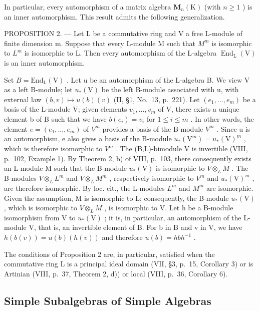 In particular, every automorphism of a matrix algebra \(\mathbf{M}_{n}(\mathrm{K})\) (with \(n \geqslant 1\) ) is an inner automorphism. This result admits the following generalization.

PROPOSITION 2. --- Let L be a commutative ring and V a free L-module of finite dimension m. Suppose that every L-module M such that \(M^{m}\) is isomorphic to \(L^{m}\) is isomorphic to L. Then every automorphism of the L-algebra \(\operatorname{End}_{\mathrm{L}}(\mathrm{V})\) is an inner automorphism.

Set \(B = \text{End}_{\text{L}}(\text{V})\) . Let u be an automorphism of the L-algebra B. We view V as a left B-module; let \(u_{*}(\text{V})\) be the left B-module associated with u, with external law \((b, v) \mapsto u(b)(v)\) (II, §1, No.~13, p.~221). Let \((e_1, \ldots, e_m)\) be a basis of the L-module V; given elements \(v_1, \ldots, v_m\) of V, there exists a unique element b of B such that we have \(b(e_i) = v_i\) for \(1 \leqslant i \leqslant m\) . In other words, the element \(e = (e_1, \ldots, e_m)\) of \(V^m\) provides a basis of the B-module \(V^m\) . Since u is an automorphism, e also gives a basis of the B-module \(u_{*}(\text{V}^m) = u_{*}(\text{V})^m\) , which is therefore isomorphic to \(V^m\) . The (B,L)-bimodule V is invertible (VIII, p.~102, Example 1). By Theorem 2, b) of VIII, p.~103, there consequently exists an L-module M such that the B-module \(u_{*}(\text{V})\) is isomorphic to \(V \otimes_{L} M\) . The B-modules \(V \otimes_{L} L^m\) and \(V \otimes_{L} M^m\) , respectively isomorphic to \(V^m\) and \(u_{*}(\text{V})^m\) , are therefore isomorphic. By loc. cit., the L-modules \(L^m\) and \(M^m\) are isomorphic. Given the assumption, M is isomorphic to L; consequently, the B-module \(u_{*}(\text{V})\) , which is isomorphic to \(V \otimes_{L} M\) , is isomorphic to V. Let h be a B-module isomorphism from V to \(u_{*}(\text{V})\) ; it is, in particular, an automorphism of the L-module V, that is, an invertible element of B. For b in B and v in V, we have \(h(b(v)) = u(b)(h(v))\) and therefore \(u(b) = hbh^{-1}\) .

The conditions of Proposition 2 are, in particular, satisfied when the commutative ring L is a principal ideal domain (VII, §3, p.~15, Corollary 3) or is Artinian (VIII, p.~37, Theorem 2, d)) or local (VIII, p.~36, Corollary 6).

\subsection{Simple Subalgebras of Simple Algebras}

